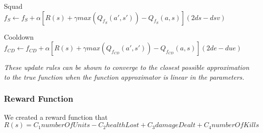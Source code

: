 \begin{flushleft}
Squad  \\ 
$f_{S}  \leftarrow f_{S}  + \alpha [ R(s) + \gamma max(Q_f_{S} (a',s'))-Q_f_{S} (a,s) ] (2ds - dsv)$
\end{flushleft} 

\begin{flushleft}
Cooldown  \\ 
$f_{CD}  \leftarrow f_{CD}  + \alpha [ R(s) + \gamma max(Q_f_{CD} (a',s'))-Q_f_{CD} (a,s) ](2de - due)$ 
\end{flushleft} 


\textit{These update rules can be shown to converge to the closest possible approximation to the true function when the function approximator is linear in the parameters. }\cite[p779]{rl}


\subsubsection{Reward Function}

We created a reward function that \\ 

$R(s) = C_1 numberOfUnits  -  C_2 healthLost  +   C_3 damageDealt  +   C_4 numberOfKills$ \\ 






